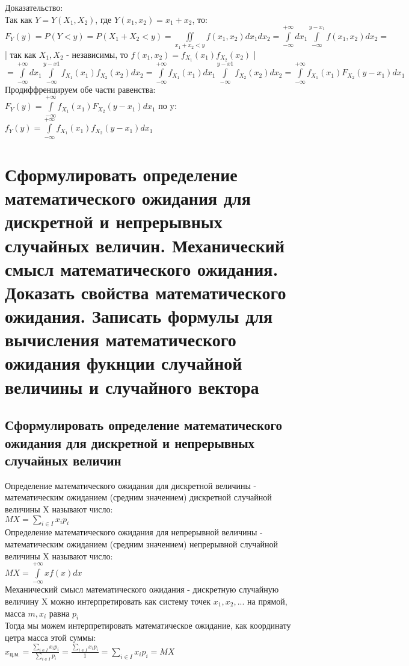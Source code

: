 Доказательство:\\
Так как $Y = Y(X_{1}, X_{2})$, где $Y(x_{1}, x_{2}) = x_{1} + x_{2}$, то:\\
$F_{Y}(y) = P(Y < y) = P(X_{1} + X_{2} < y) = \iint\limits_{x_{1} + x_{2} < y} f(x_{1}, x_{2}) dx_{1} dx_{2} = \int\limits_{-\infty}^{+\infty} dx_{1} \int\limits_{-\infty}^{y - x_{1}} f(x_{1}, x_{2}) dx_{2} = $ | так как $X_{1}, X_{2}$ - независимы, то $f(x_{1}, x_{2}) = f_{X_{1}}(x_{1})f_{X_{2}}(x_{2})$ |$ = \int\limits_{-\infty}^{+\infty} dx_{1} \int\limits_{-\infty}^{y - x{1}} f_{X_{1}}(x_{1}) f_{X_{2}}(x_{2}) dx_{2} = \int\limits^{+\infty}_{-\infty} f_{X_{1}}(x_{1}) dx_{1} \int\limits_{-\infty}^{y - x{1}} f_{X_{2}}(x_{2}) dx_{2} =  \int\limits^{+\infty}_{-\infty} f_{X_{1}}(x_{1}) F_{X_{2}} (y - x_{1}) dx_{1}$\\
Продиффренцируем обе части равенства:\\
$F_{Y}(y) = \int\limits_{-\infty}^{+\infty} f_{X_{1}}(x_{1}) F_{X_{2}}(y - x_{1}) dx_{1}$ по y:\\
$f_{Y}(y) = \int\limits_{-\infty}^{+\infty} f_{X_{1}}(x_{1}) f_{X_{2}}(y - x_{1}) dx_{1}$

\section{Сформулировать определение математического ожидания для дискретной и непрерывных случайных величин. Механический смысл математического ожидания. Доказать свойства математического ожидания. Записать формулы для вычисления математического ожидания фукнции случайной величины и случайного вектора}
\subsection{Сформулировать определение математического ожидания для дискретной и непрерывных случайных величин}
Определение математического ожидания для дискретной величины - математическим ожиданием (средним значением) дискретной случайной величины X называют число:\\
$MX = \sum\limits_{i \in I} x_{i} p_{i}$\\

Определение математического ожидания для непрерывной величины - математическим ожиданием (средним значением) непрерывной случайной величины X называют число:\\
$MX = \int\limits_{-\infty}^{+\infty} x f(x) dx$\\

Механический смысл математического ожидания - дискретную случайную величину X можно интерпретировать как систему точек $x_{1}, x_{2}, ...$ на прямой, масса $m, x_{i}$ равна $p_{i}$\\
Тогда мы можем интерпретировать математическое ожидание, как координату цетра масса этой суммы:\\
$x_{\text{ц.м.}} = \frac{\sum\limits_{i \in I} x_{i} p_{i}}{\sum\limits_{i \in I} p_{i}} = \frac{\sum\limits_{i \in I} x_{i} p_{i}}{1} = \sum\limits_{i \in I} x_{i} p_{i} = MX$\\
